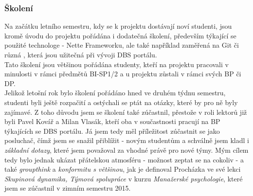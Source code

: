 \subsubsection{Školení}
Na začátku letního semestru, kdy se k projektu dostávají noví studenti, jsou kromě úvodu do projektu pořádána i dodatečná školení, především týkající se použité technologe - Nette Frameworku, ale také například zaměřená na Git či různá , která jsou užitečná při vývoji DBS portálu.\\
Tato školení jsou většinou pořádána studenty, kteří na projektu pracovali v minulosti v rámci předmětů BI-SP1/2 a u projektu zůstali v rámci svých BP či DP.\\
Jelikož letošní rok bylo školení pořádáno hned ve druhém týdnu semestru, studenti byli ještě rozpačití a ostýchali se ptát na otázky, které by pro ně byly zajímavé. Z toho důvodu jsem se školení také zúčastnil, přestože v roli lektorů již byli Pavel Kovář a Milan Vlasák, kteří oba v součastnosti pracují na BP týkajících se DBS portálu. Já jsem tedy měl příležitost zúčastnit se jako posluchač, čímž jsem se snažil přiblížit  - novým studentům a schválně jsem kladl i \emph{základní dotazy}, které jsem považoval za vhodné právě pro nové týmy. Mým cílem tedy bylo jednak ukázat přátelskou atmosféru - možnost zeptat se na cokoliv - a také  \emph{groupthink} a \emph{konformitu s většinou}, jak je definoval Procházka \cite{prochazka} ve své lekci \emph{Skupinová dynamika, Týmová spolupráce} v kurzu \emph{Manažerské psychologie}, které jsem se zúčastnil v zimním semestru 2015.
